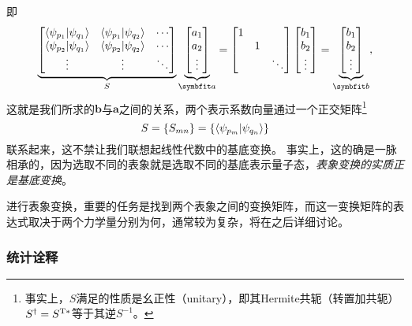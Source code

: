 即
\begin{equation}
    \underbrace{
    \begin{bmatrix}
        \braket{\psi_{p_1}}{\psi_{q_1}} & \braket{\psi_{p_1}}{\psi_{q_2}} & \cdots \\
        \braket{\psi_{p_2}}{\psi_{q_1}} & \braket{\psi_{p_2}}{\psi_{q_2}} & \cdots \\
        \vdots & \vdots & \ddots
    \end{bmatrix}}_{S}
    \underbrace{\begin{bmatrix}
        a_1 \\ a_2 \\ \vdots
    \end{bmatrix}}_{\bm{a}}
    =
    \begin{bmatrix}
        1 \\ & 1 \\ & & \ddots
    \end{bmatrix}
    \begin{bmatrix}
        b_1 \\ b_2 \\ \vdots
    \end{bmatrix}
    =
    \underbrace{\begin{bmatrix}
        b_1 \\ b_2 \\ \vdots
    \end{bmatrix}}_{\bm{b}},
\end{equation}
这就是我们所求的$\bm{b}$与$\bm{a}$之间的关系，两个表示系数向量通过一个正交矩阵\footnote{事实上，$S$满足的性质是幺正性（unitary），即其Hermite共轭（转置加共轭）$S^{\dagger}=S^{\rm{T}*}$等于其逆$S^{-1}$。}
\begin{equation}
    \label{eq:principles_rep_trans_mat}
    S=\{S_{mn}\}=\{\braket{\psi_{p_m}}{\psi_{q_n}}\}
\end{equation}
联系起来，这不禁让我们联想起线性代数中的基底变换。
事实上，这的确是一脉相承的，因为选取不同的表象就是选取不同的基底表示量子态，\emph{表象变换的实质正是基底变换}。

进行表象变换，重要的任务是找到两个表象之间的变换矩阵，而这一变换矩阵的表达式取决于两个力学量分别为何，通常较为复杂，将在之后详细讨论。


\subsubsection{统计诠释}

